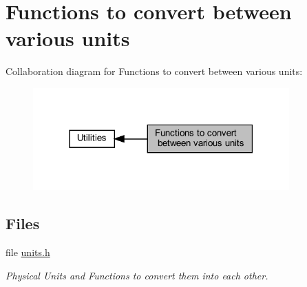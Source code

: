 \hypertarget{group__units}{}\section{Functions to convert between various units}
\label{group__units}
Collaboration diagram for Functions to convert between various units\+:
\nopagebreak
\begin{figure}[H]
\begin{center}
\leavevmode
\includegraphics[width=279pt]{group__units}
\end{center}
\end{figure}
\subsection*{Files}
\begin{DoxyCompactItemize}
\item 
file \hyperlink{units_8h}{units.\+h}
\begin{DoxyCompactList}\small\item\em Physical Units and Functions to convert them into each other. \end{DoxyCompactList}\end{DoxyCompactItemize}
